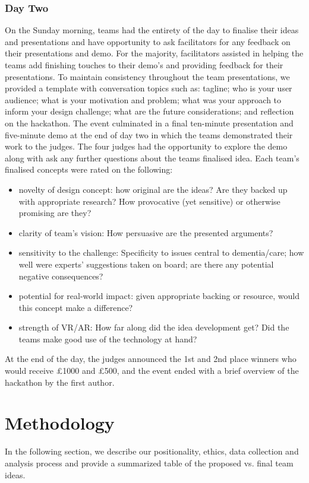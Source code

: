 \subsubsection{Day Two}
\label{DayTwo}
On the Sunday morning, teams had the entirety of the day to finalise their ideas and presentations and have opportunity to ask facilitators for any feedback on their presentations and demo. For the majority, facilitators assisted in helping the teams add finishing touches to their demo’s and providing feedback for their presentations. To maintain consistency throughout the team presentations, we provided a template with conversation topics such as: tagline; who is your user audience; what is your motivation and problem; what was your approach to inform your design challenge; what are the future considerations; and reflection on the hackathon. The event culminated in a final ten-minute presentation and five-minute demo at the end of day two in which the teams demonstrated their work to the judges. The four judges had the opportunity to explore the demo along with ask any further questions about the teams finalised idea. Each team’s finalised concepts were rated on the following:
\begin{itemize}
\item novelty of design concept: how original are the ideas? Are they backed up with appropriate research? How provocative (yet sensitive) or otherwise promising are they?
\item clarity of team's vision: How persuasive are the presented arguments?
\item sensitivity to the challenge: Specificity to issues central to dementia/care; how well were experts’ suggestions taken on board; are there any potential negative consequences?
\item potential for real-world impact: given appropriate backing or resource, would this concept make a difference?
\item strength of VR/AR: How far along did the idea development get? Did the teams make good use of the technology at hand? 
\end{itemize}

At the end of the day, the judges announced the 1st and 2nd place winners who would receive £1000 and £500, and the event ended with a brief overview of the hackathon by the first author. 



\section{Methodology}
\label{sec:methodology}
In the following section, we describe our positionality, ethics, data collection and analysis process and provide a summarized table of the proposed vs. final team ideas.

